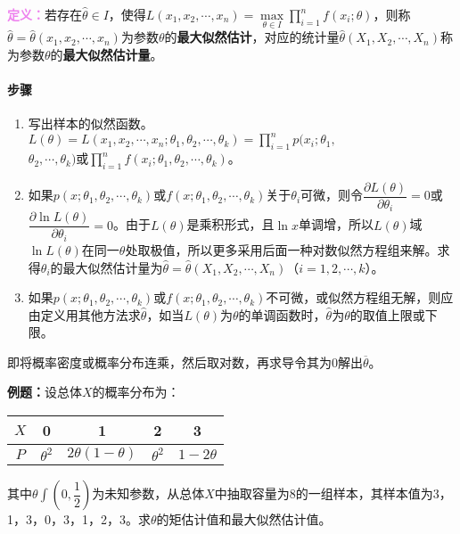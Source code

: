 \documentclass[UTF8, 12pt]{ctexart}
\begin{document}
\textcolor{violet}{\textbf{定义：}}若存在$\hat{\theta}\in I$，使得$L(x_1,x_2,\cdots,x_n)=\max\limits_{\theta\in I}\prod\limits_{i=1}^nf(x_i;\theta)$，则称$\hat{\theta}=\hat{\theta}(x_1,x_2,\cdots,x_n)$为参数$\theta$的\textbf{最大似然估计}，对应的统计量$\hat{\theta}(X_1,X_2,\cdots,X_n)$称为参数$\theta$的\textbf{最大似然估计量}。

\paragraph{步骤} \leavevmode \medskip

\begin{enumerate}
    \item 写出样本的似然函数。$L(\theta)=L(x_1,x_2,\cdots,x_n;\theta_1,\theta_2,\cdots,\theta_k)=\prod\limits_{i=1}^np(x_i;\theta_1,$\\$\theta_2,\cdots,\theta_k)$或$\prod\limits_{i=1}^nf(x_i;\theta_1,\theta_2,\cdots,\theta_k)$。
    \item 如果$p(x;\theta_1,\theta_2,\cdots,\theta_k)$或$f(x;\theta_1,\theta_2,\cdots,\theta_k)$关于$\theta_i$可微，则令$\dfrac{\partial L(\theta)}{\partial\theta_i}=0$或$\dfrac{\partial\ln L(\theta)}{\partial\theta_i}=0$。由于$L(\theta)$是乘积形式，且$\ln x$单调增，所以$L(\theta)$域$\ln L(\theta)$在同一$\theta$处取极值，所以更多采用后面一种对数似然方程组来解。求得$\theta_i$的最大似然估计量为$\hat{\theta}=\hat{\theta}(X_1,X_2,\cdots,X_n)$（$i=1,2,\cdots,k$）。
    \item 如果$p(x;\theta_1,\theta_2,\cdots,\theta_k)$或$f(x;\theta_1,\theta_2,\cdots,\theta_k)$不可微，或似然方程组无解，则应由定义用其他方法求$\hat{\theta}$，如当$L(\theta)$为$\theta$的单调函数时，$\hat{\theta}$为$\theta$的取值上限或下限。
\end{enumerate}

即将概率密度或概率分布连乘，然后取对数，再求导令其为0解出$\overline{\theta}$。

\textbf{例题：}设总体$X$的概率分布为：

\begin{tabular}{c|cccc}
    \hline
    $X$ & 0 & 1 & 2 & 3 \\ \hline
    $P$ & $\theta^2$ & $2\theta(1-\theta)$ & $\theta^2$ & $1-2\theta$ \\ \hline
\end{tabular} \medskip

其中$\theta\int\left(0,\dfrac{1}{2}\right)$为未知参数，从总体$X$中抽取容量为8的一组样本，其样本值为3，1，3，0，3，1，2，3。求$\theta$的矩估计值和最大似然估计值。
\end{document}
